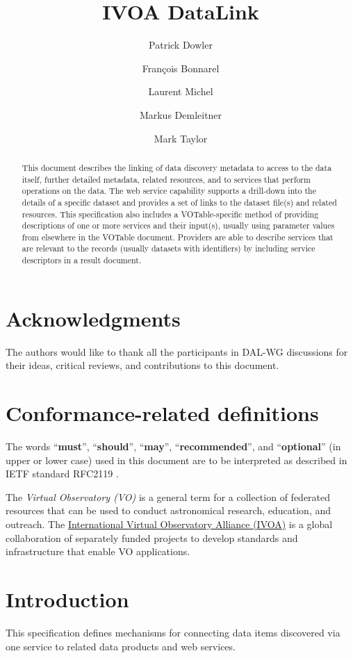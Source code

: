\documentclass[11pt,a4paper]{ivoa}
\title{IVOA DataLink}
\author[http://www.ivoa.net/twiki/bin/view/IVOA/PatrickDowler]
       {Patrick Dowler}
\author[http://www.ivoa.net/twiki/bin/view/IVOA/FrancoisBonnarel]
       {Fran\c{c}ois Bonnarel}
\author[http://www.ivoa.net/twiki/bin/view/IVOA/LaurentMichel]
       {Laurent Michel}
\author[http://www.ivoa.net/twiki/bin/view/IVOA/MarkusDemleitner]
       {Markus Demleitner}
\author[http://www.ivoa.net/twiki/bin/view/IVOA/MarkTaylor]
       {Mark Taylor}
\newcommand{\rfcmust}{\textbf{must}}
\newcommand{\rfcshould}{\textbf{should}}
\newcommand{\rfcmay}{\textbf{may}}
\newcommand{\rfcrecommended}{\textbf{recommended}}
\newcommand{\rfcoptional}{\textbf{optional}}
\begin{document}
\begin{abstract}
This document describes the linking of data discovery metadata
to access to the data itself, further detailed metadata, related
resources, and to services that perform operations on the data. The web
service capability supports a drill-down into the details of a specific
dataset and provides a set of links to the dataset file(s) and related
resources. This specification also includes a VOTable-specific method
of providing descriptions of one or more services and their input(s),
usually using parameter values from elsewhere in the VOTable document.
Providers are able to describe services that are relevant to the records
(usually datasets with identifiers) by including service descriptors in
a result document.
\end{abstract}


\section*{Acknowledgments}

The authors would like to thank all the participants in DAL-WG discussions
for their ideas, critical reviews, and contributions to this document.


\section*{Conformance-related definitions}

The words ``\rfcmust'', ``\rfcshould'', ``\rfcmay'', ``\rfcrecommended'', and
``\rfcoptional'' (in upper or lower case) used in this document are to be
interpreted as described in IETF standard RFC2119 \citep{std:RFC2119}.

The \emph{Virtual Observatory (VO)} is a
general term for a collection of federated resources that can be used
to conduct astronomical research, education, and outreach.
The \href{http://www.ivoa.net}{International
Virtual Observatory Alliance (IVOA)} is a global
collaboration of separately funded projects to develop standards and
infrastructure that enable VO applications.


\section{Introduction}

This specification defines mechanisms for connecting data items
discovered via one service to related data products and web services.
\end{document}
